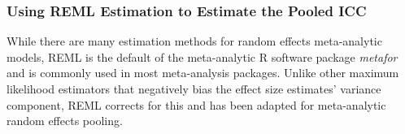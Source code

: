 


\subsubsection{Using REML Estimation to Estimate the Pooled ICC} 
While there are many estimation methods for random effects meta-analytic models, REML is the default of the meta-analytic R software package \emph{metafor} \cite{viechtbauer2010} and is commonly used in most meta-analysis packages. Unlike other maximum likelihood estimators that negatively bias the effect size estimates' variance component, REML corrects for this and has been adapted for meta-analytic random effects pooling\cite{raudenbush2009analyzing, viechtbauer2015}.


